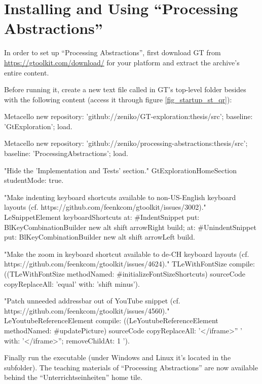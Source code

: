 
\chapter{Installing and Using ``Processing Abstractions''} \label{app_setup}

In order to set up ``Processing Abstractions'', first download \ac{GT} from \url{https://gtoolkit.com/download/} for your platform and extract the archive's entire content.

Before running it, create a new text file called  in \ac{GT}'s top-level folder besides  with the following content (access it through figure \ref{fig_startup_st_qr}):

\begin{code}
Metacello new
	repository: 'github://zeniko/\ac{GT}-exploration:thesis/src';
	baseline: 'GtExploration';
	load.

Metacello new
	repository: 'github://zeniko/processing-abstractions:thesis/src';
	baseline: 'ProcessingAbstractions';
	load.

"Hide the 'Implementation and Tests' section."
GtExplorationHomeSection studentMode: true.

"Make indenting keyboard shortcuts available to non-US-English keyboard layouts
(cf. https://github.com/feenkcom/gtoolkit/issues/3002)."
LeSnippetElement keyboardShortcuts
	at: #IndentSnippet
		put: BlKeyCombinationBuilder new alt shift arrowRight build;
	at: #UnindentSnippet
		put: BlKeyCombinationBuilder new alt shift arrowLeft build.

"Make the zoom in keyboard shortcut available to de-CH keyboard layouts
(cf. https://github.com/feenkcom/gtoolkit/issues/4624)."
TLeWithFontSize compile:
	((TLeWithFontSize methodNamed: #initializeFontSizeShortcuts) sourceCode
		copyReplaceAll: 'equal' with: 'shift minus').

"Patch unneeded addressbar out of YouTube snippet
(cf. https://github.com/feenkcom/gtoolkit/issues/4560)."
LeYoutubeReferenceElement compile:
	((LeYoutubeReferenceElement methodNamed: #updatePicture) sourceCode
		copyReplaceAll: '</iframe>'' ' with: '</iframe>''; removeChildAt: 1 ').
\end{code}

Finally run the  executable (under Windows and Linux it's located in the  subfolder). The teaching materials of ``Processing Abstractions'' are now available behind the ``Unterrichtseinheiten'' home tile.


